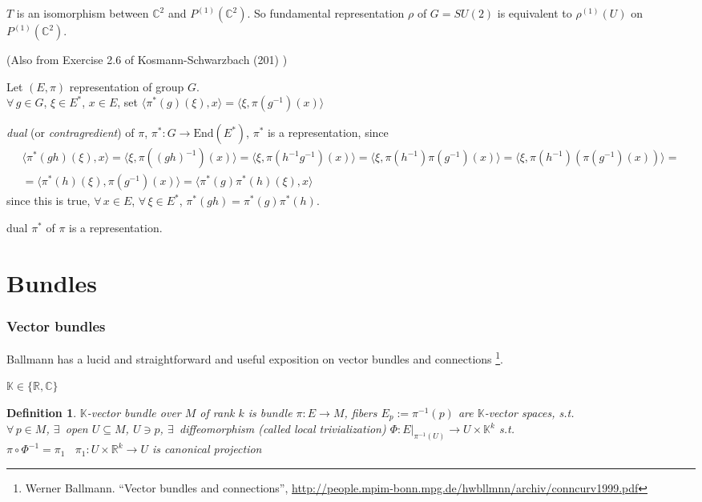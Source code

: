 \documentclass[10pt]{amsart}
\newtheorem{definition}{Definition}
\newcommand{\exercisehead}[1]
  { \smallskip
   \noindent{\small\bf Exercise #1.}
  }
\begin{document}
\begin{multicols*}{2}
$T$ is an isomorphism between $\mathbb{C}^2$ and $P^{(1)}(\mathbb{C}^2)$.  So fundamental representation $\rho$ of $G=SU(2)$ is equivalent to $\rho^{(1)}(U)$ on $P^{(1)}(\mathbb{C}^2)$.  

\exercisehead{23}\cite{JBaezJMuniain1994} (Also from Exercise 2.6 of Kosmann-Schwarzbach (201) \cite{YKosmann-Schwarzbach2010})

Let $(E,\pi)$ representation of group $G$.  \\
$\forall \, g \in G$, $\xi \in E^*$, $x\in E$, set $\langle \pi^*(g)(\xi), x \rangle = \langle \xi, \pi(g^{-1})(x) \rangle$

 \emph{dual} (or \emph{contragredient}) of $\pi$, $\pi^*:G \to \text{End}(E^*)$, $\pi^*$ is a representation, since
\[
\begin{gathered}
  \langle \pi^*(gh)(\xi),x\rangle = \langle \xi, \pi((gh)^{-1})(x) \rangle = \langle \xi, \pi(h^{-1}g^{-1})(x) \rangle = \langle \xi, \pi(h^{-1}) \pi(g^{-1})(x) \rangle = \langle \xi, \pi(h^{-1}) (\pi(g^{-1})(x)) \rangle =  \\
= \langle \pi^*(h)(\xi), \pi(g^{-1})(x) \rangle = \langle \pi^*(g)\pi^*(h)(\xi), x \rangle
\end{gathered}
\]
since this is true, $\forall \, x \in E$, $\forall \, \xi \in E^*$, $\pi^*(gh) = \pi^*(g)\pi^*(h)$.  

dual $\pi^*$ of $\pi$ is a representation.  


\part{Bundles}

\cite{CTaubes2011}


\section{Vector bundles}

Ballmann has a lucid and straightforward and useful exposition on vector bundles and connections \cite{WBallmann1999} \footnote{Werner Ballmann. ``Vector bundles and connections'', \url{http://people.mpim-bonn.mpg.de/hwbllmnn/archiv/conncurv1999.pdf}}.  

  $\mathbb{K} \in \lbrace \mathbb{R},\mathbb{C} \rbrace$
\begin{definition}
$\mathbb{K}$-vector bundle over $M$ of rank $k$ is bundle $\pi:E \to M$, fibers $E_p := \pi^{-1}(p)$ are $\mathbb{K}$-vector spaces, s.t. \\
$\forall \, p \in M$, $\exists \, $ open $U \subseteq M$, $U \ni p$, $\exists \, $ diffeomorphism (called local trivialization) $\Phi: \left. E \right|_{\pi^{-1}(U) } \to U\times \mathbb{K}^k$ s.t. \\
\phantom{ \quad \, } $\pi \circ \Phi^{-1} = \pi_1$ \quad \, $\pi_1 : U \times \mathbb{R}^k \to U$ is canonical projection \\


\end{definition}
\end{multicols*}
\end{document}
